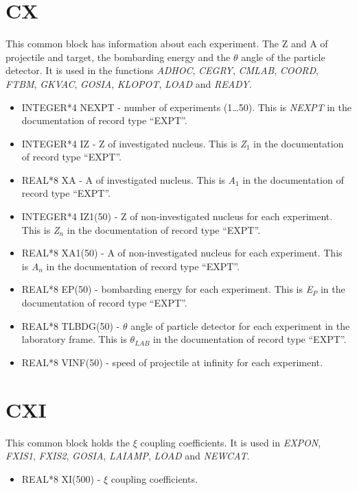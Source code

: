 \section{CX}

This common block has information about each experiment. The Z and A of
projectile and target, the bombarding energy and the $\theta$ angle of the
particle detector. It is used in the functions {\em ADHOC}, {\em CEGRY},
{\em CMLAB}, {\em COORD}, {\em FTBM}, {\em GKVAC}, {\em GOSIA}, {\em
KLOPOT}, {\em LOAD} and {\em READY}.

\begin{itemize}
\item INTEGER*4 NEXPT - number of experiments (1{\ldots}50). This is {\em
NEXPT} in the documentation of record type ``EXPT''.
\item INTEGER*4 IZ - Z of investigated nucleus. This is {\em Z$_1$} in the
documentation of record type ``EXPT''.
\item REAL*8 XA - A of investigated nucleus. This is {\em A$_1$} in the
documentation of record type ``EXPT''.
\item INTEGER*4 IZ1(50) - Z of non-investigated nucleus for each experiment.
This is {\em Z$_n$} in the documentation of record type ``EXPT''.
\item REAL*8 XA1(50) - A of non-investigated nucleus for each experiment.
This is {\em A$_n$} in the documentation of record type ``EXPT''.
\item REAL*8 EP(50) - bombarding energy for each experiment. This is {\em
E$_P$} in the documentation of record type ``EXPT''.
\item REAL*8 TLBDG(50) - $\theta$ angle of particle detector for each
experiment in the laboratory frame. This is {\em $\theta_{LAB}$} in the
documentation of record type ``EXPT''.
\item REAL*8 VINF(50) - speed of projectile at infinity for each experiment.
\end{itemize}

\section{CXI}

This common block holds the $\xi$ coupling coefficients. It is used in {\em
EXPON}, {\em FXIS1}, {\em FXIS2}, {\em GOSIA}, {\em LAIAMP}, {\em LOAD} and
{\em NEWCAT}.

\begin{itemize}
\item REAL*8 XI(500) - $\xi$ coupling coefficients.
\end{itemize}


